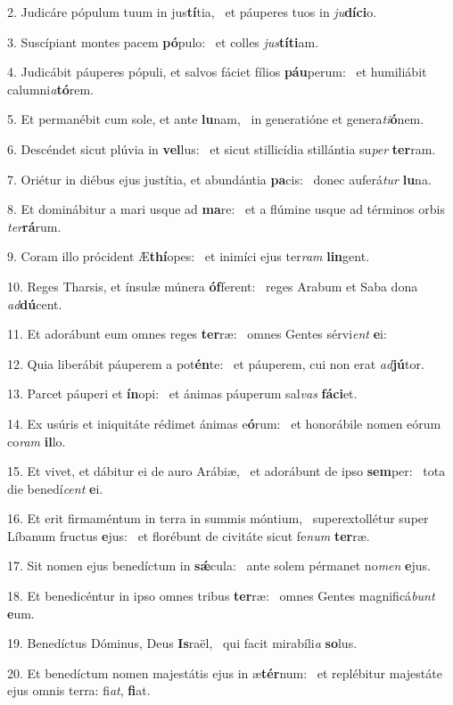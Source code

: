 2. Judicáre pópulum tuum in jus\textbf{tí}tia, \ast\  et páuperes tuos in \textit{ju}\textbf{dí}\textbf{ci}o.\

3. Suscípiant montes pacem \textbf{pó}pulo: \ast\  et colles \textit{jus}\textbf{tí}\textbf{ti}am.\

4. Judicábit páuperes pópuli, et salvos fáciet fílios \textbf{páu}perum: \ast\  et humiliábit calumni\textit{a}\textbf{tó}rem.\

5. Et permanébit cum sole, et ante \textbf{lu}nam, \ast\  in generatióne et genera\textit{ti}\textbf{ó}nem.\

6. Descéndet sicut plúvia in \textbf{vel}lus: \ast\  et sicut stillicídia stillántia su\textit{per} \textbf{ter}ram.\

7. Oriétur in diébus ejus justítia, et abundántia \textbf{pa}cis: \ast\  donec auferá\textit{tur} \textbf{lu}na.\

8. Et dominábitur a mari usque ad \textbf{ma}re: \ast\  et a flúmine usque ad términos orbis \textit{ter}\textbf{rá}rum.\

9. Coram illo prócident Æ\textbf{thí}opes: \ast\  et inimíci ejus ter\textit{ram} \textbf{lin}gent.\

10. Reges Tharsis, et ínsulæ múnera \textbf{óf}ferent: \ast\  reges Arabum et Saba dona \textit{ad}\textbf{dú}cent.\

11. Et adorábunt eum omnes reges \textbf{ter}ræ: \ast\  omnes Gentes sérvi\textit{ent} \textbf{e}i:\

12. Quia liberábit páuperem a pot\textbf{én}te: \ast\  et páuperem, cui non erat \textit{ad}\textbf{jú}tor.\

13. Parcet páuperi et \textbf{ín}opi: \ast\  et ánimas páuperum sal\textit{vas} \textbf{fá}\textbf{ci}et.\

14. Ex usúris et iniquitáte rédimet ánimas e\textbf{ó}rum: \ast\  et honorábile nomen eórum co\textit{ram} \textbf{il}lo.\

15. Et vivet, et dábitur ei de auro Arábiæ, \dag\  et adorábunt de ipso \textbf{sem}per: \ast\  tota die benedí\textit{cent} \textbf{e}i.\

16. Et erit firmaméntum in terra in summis móntium, \dag\  superextollétur super Líbanum fructus \textbf{e}jus: \ast\  et florébunt de civitáte sicut fe\textit{num} \textbf{ter}ræ.\

17. Sit nomen ejus benedíctum in \textbf{sǽ}cula: \ast\  ante solem pérmanet no\textit{men} \textbf{e}jus.\

18. Et benedicéntur in ipso omnes tribus \textbf{ter}ræ: \ast\  omnes Gentes magnificá\textit{bunt} \textbf{e}um.\

19. Benedíctus Dóminus, Deus \textbf{Is}raël, \ast\  qui facit mirabíli\textit{a} \textbf{so}lus.\

20. Et benedíctum nomen majestátis ejus in æ\textbf{tér}num: \ast\  et replébitur majestáte ejus omnis terra: fi\textit{at}, \textbf{fi}at.\

